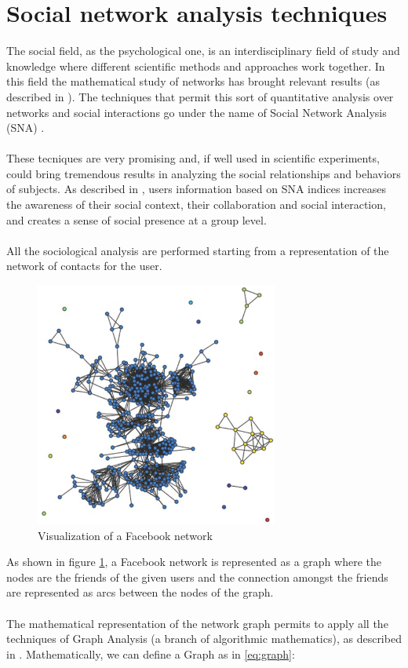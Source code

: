 \label{sec:sna}
\section{Social network analysis techniques}
The social field, as the psychological one, is an interdisciplinary field of study and knowledge where different scientific methods and approaches work together.
In this field the mathematical study of networks has brought relevant results (as described in \cite{Wassermann-1994}).
The techniques that permit this sort of quantitative analysis over networks and social interactions go under the name of Social Network Analysis (SNA) \cite{Butts-2005}.\\
\\
These tecniques are very promising and, if well used in scientific experiments, could bring tremendous results in analyzing the social relationships and behaviors
of subjects.
As described in \cite{Martino-2007}, users information based on SNA indices increases the awareness of their social context, their collaboration and social interaction,
and creates a sense of social presence at a group level.\\
\\
All the sociological analysis are performed starting from a representation of the network of contacts for the user.

\begin{figure}[h]
\centering
\includegraphics[width=8cm]{Fig1fbnetwork.eps}
\caption{Visualization of a Facebook network}
\label{fig:fbnetwork}
\end{figure}

As shown in figure \ref{fig:fbnetwork}, a Facebook network is represented as a graph where the nodes are the friends of the given users and the connection amongst the
friends are represented as arcs between the nodes of the graph.\\
\\
The mathematical representation of the network graph permits to apply all the techniques of Graph Analysis (a branch of algorithmic mathematics), as described in
\cite{Biggs-1999}.
Mathematically, we can define a Graph as in \ref{eq:graph}:\\

